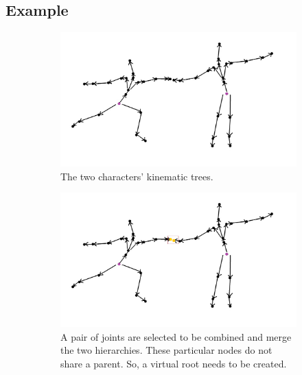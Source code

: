 \newpage

\subsection{Example}
\begin{figure}[H]
	\centering
        \begin{subfigure}[b!]{0.6\textwidth}
        	\centering
                \includegraphics[width=\linewidth]{img/algorithm2}
                \caption{The two characters' kinematic trees.}
        \end{subfigure}
        \quad
        \begin{subfigure}[b!]{0.6\textwidth}
        	\centering
                \includegraphics[width=\linewidth]{img/algorithm3}
                \caption{A pair of joints are selected to be combined and merge the two hierarchies. These particular nodes do not share a parent. So, a virtual root needs to be created.}
        \end{subfigure}
        \quad
        \begin{subfigure}[b!]{0.6\textwidth}
        	\centering

\end{subfigure}
\end{figure}
